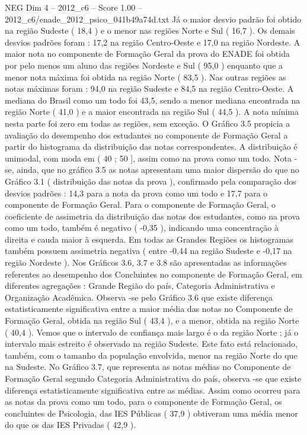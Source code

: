 \begin{textsample}{NEG Dim 4 – 2012\_c6 – Score 1.00 – 2012\_c6/enade\_2012\_psico\_041b49a74d.txt}
Já o maior desvio padrão foi obtido na região Sudeste ( 18,4 ) e o menor nas regiões Norte e Sul ( 16,7 ).
Os demais desvios padrões foram : 17,2 na região Centro-Oeste e 17,0 na região Nordeste.
A maior nota no componente de Formação Geral da prova do ENADE foi obtida por pelo menos um aluno das regiões Nordeste e Sul ( 95,0 ) enquanto que a menor nota máxima foi obtida na região Norte ( 83,5 ).
Nas outras regiões as notas máximas foram : 94,0 na região Sudeste e 84,5 na região Centro-Oeste.
A mediana do Brasil como um todo foi 43,5, sendo a menor mediana encontrada na região Norte ( 41,0 ) e a maior encontrada na região Sul ( 44,5 ).
A nota mínima nesta parte foi zero em todas as regiões, sem exceção.
O Gráfico 3.5 propicia a avaliação do desempenho dos estudantes no componente de Formação Geral a partir do histograma da distribuição das notas correspondentes.
A distribuição é unimodal, com moda em ( 40 ; 50 ], assim como na prova como um todo.
Nota -se, ainda, que no gráfico 3.5 as notas apresentam uma maior dispersão do que no Gráfico 3.1 ( distribuição das notas da prova ), confirmado pela comparação dos desvios padrões : 14,3 para a nota da prova como um todo e 17,7 para o componente de Formação Geral.
Para o componente de Formação Geral, o coeficiente de assimetria da distribuição das notas dos estudantes, como na prova como um todo, também é negativo ( -0,35 ), indicando uma concentração à direita e cauda maior à esquerda.
Em todas as Grandes Regiões os histogramas também possuem assimetria negativa ( entre -0,44 na região Sudeste e -0,17 na região Nordeste ).
Nos Gráficos 3.6, 3.7 e 3.8 são apresentadas as informações referentes ao desempenho dos Concluintes no componente de Formação Geral, em diferentes agregações : Grande Região do país, Categoria Administrativa e Organização Acadêmica.
Observa -se pelo Gráfico 3.6 que existe diferença estatisticamente significativa entre a maior média das notas no Componente de Formação Geral, obtida na região Sul ( 43,4 ), e a menor, obtida na região Norte ( 40,4 ).
Vemos que o intervalo de confiança mais largo é o da região Norte ; já o intervalo mais estreito é observado na região Sudeste.
Este fato está relacionado, também, com o tamanho da população envolvida, menor na região Norte do que na Sudeste.
No Gráfico 3.7, que representa as notas médias no Componente de Formação Geral segundo Categoria Administrativa do país, observa -se que existe diferença estatisticamente significativa entre as médias.
Assim como ocorreu para as notas da prova como um todo, para o componente de Formação Geral, os concluintes de Psicologia, das IES Públicas ( 37,9 ) obtiveram uma média menor do que os das IES Privadas ( 42,9 ).

\end{textsample}
